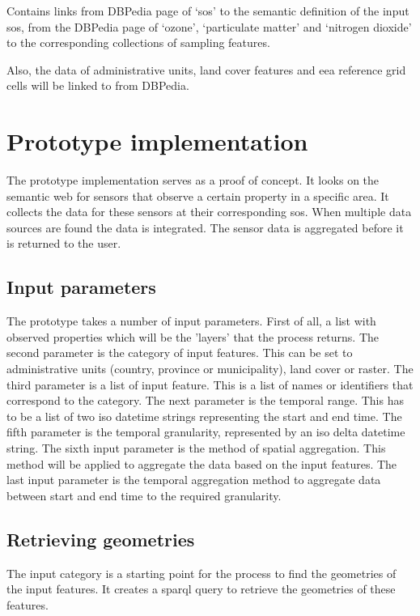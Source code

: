 Contains links from DBPedia page of `\acl{sos}' to the semantic definition of the input \ac{sos}, from the DBPedia page of `ozone', `particulate matter' and `nitrogen dioxide' to the corresponding collections of sampling features.

Also, the data of administrative units, land cover features and \ac{eea} reference grid cells will be linked to from DBPedia.

\section{Prototype implementation}
The prototype implementation serves as a proof of concept. It looks on the semantic web for sensors that observe a certain property in a specific area. It collects the data for these sensors at their corresponding \acl{sos}. When multiple data sources are found the data is integrated. The sensor data is aggregated before it is returned to the user.

\subsection{Input parameters}
The prototype takes a number of input parameters. First of all, a list with observed properties which will be the 'layers' that the process returns. The second parameter is the category of input features. This can be set to administrative units (country, province or municipality), land cover or raster. The third parameter is a list of input feature. This is a list of names or identifiers that correspond to the category. The next parameter is the temporal range. This has to be a list of two \ac{iso} datetime strings representing the start and end time. The fifth parameter is the temporal granularity, represented by an \ac{iso} delta datetime string. The sixth input parameter is the method of spatial aggregation. This method will be applied to aggregate the data based on the input features. The last input parameter is the temporal aggregation method to aggregate data between start and end time to the required granularity.      

\subsection{Retrieving geometries}
The input category is a starting point for the process to find the geometries of the input features. It creates a \ac{sparql} query to retrieve the geometries of these features. 

